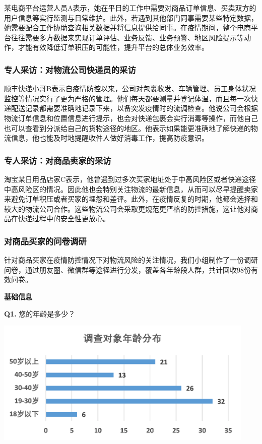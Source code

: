\documentclass[12pt]{article}
\begin{document}
某电商平台运营人员A表示，她在平日的工作中需要对商品订单信息、买卖双方的用户信息等实行监测与日常维护。此外，若遇到其他部门同事需要某些特定数据，她需要配合工作协助查询相关数据并将信息提供给同事。在疫情期间，整个电商平台往往需要多方数据来实现订单评估、业务反馈、业务预警、地区风险提示等动作，才能有效降低订单积压的可能性，提升平台的总体业务效率。

\subsubsection{专人采访：对物流公司快递员的采访}

顺丰快递小哥B表示自疫情防控以来，公司对包裹收发、车辆管理、员工身体状况监控等情况实行了更为严格的管理。他们每天都要测量并登记体温，而且每一次快递配送记录都需要准确地记录下来，以备突发疫情时的流调检查。他说公司会根据物流订单信息和位置信息进行提示，也会对快递包裹会实行消毒等操作，而他自己也可以查看到分派给自己的货物途径的地区。他表示如果能更准确地了解快递的物流信息，他也能及时地提醒收件人做好消毒工作，提高防疫意识。

\subsubsection{专人采访：对商品卖家的采访}

淘宝某日用品店家C表示，他曾遇到过多次买家地址处于中高风险区或者快递途径中高风险区的情况。因此他也会特别关注物流的最新信息，从而可以尽早提醒卖家来避免订单积压或者买家的埋怨和差评。此外，在疫情反复的时期，他都会选择和较大的物流公司合作。这些物流公司会采取更规范更严格的防控措施，这让他对商品在快递过程中的安全性更放心。

\subsubsection{对商品买家的问卷调研}

针对商品买家在疫情防控情况下对物流风险的关注情况，我们小组制作了一份调研问卷，通过朋友圈、微信群等途径进行分发，覆盖各年龄段人群，共计回收98份有效问卷。

\noindent \textbf{基础信息}

\noindent \textbf{Q1.} 您的年龄是多少？
\begin{center}
	\includegraphics[height=6cm]{survey1.png}
\end{center}
\end{document}
